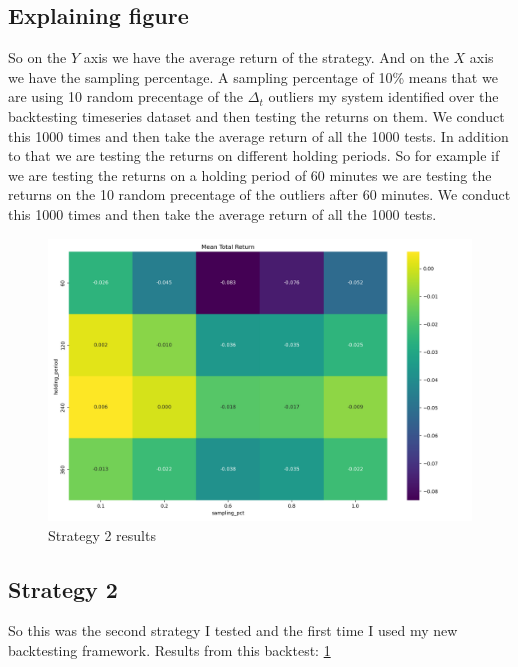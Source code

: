 \documentclass[12pt]{article}
\begin{document}
\newpage

\subsection{Explaining figure}
So on the $Y$ axis we have the average return of the strategy. And on the $X$ axis we have the sampling percentage. 
A sampling percentage of 10\% means that we are using 10 random precentage of the $\Delta_t$ outliers my system identified over the backtesting timeseries dataset and then testing the returns on them. We conduct this 1000 times and then take the average return of all the 1000 tests. In addition to that we are testing the returns on different holding periods. So for example if we are testing the returns on a holding period of 60 minutes we are testing the returns on the 10 random precentage of the outliers after 60 minutes. We conduct this 1000 times and then take the average return of all the 1000 tests.




\begin{figure}[H]
  \centering
  \includegraphics[width=\textwidth]{imgs/Bullish_outliers_inside_of_uptrend.png}
  \caption{Strategy 2 results}
  \label{fig:bullish_outliers_inside_of_uptrend}
\end{figure}


\subsection{Strategy 2}

So this was the second strategy I tested and the first time I used my new backtesting framework. 
Results from this backtest: \ref{fig:bullish_outliers_inside_of_uptrend}
\end{document}
